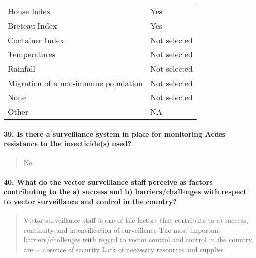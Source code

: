 \documentclass[
]{article}
\begin{document}
\begin{longtable}[]{@{}ll@{}}
\toprule
\endhead
House Index & Yes \\
Breteau Index & Yes \\
Container Index & Not selected \\
Temperatures & Not selected \\
Rainfall & Not selected \\
Migration of a non-immune population & Not selected \\
None & Not selected \\
Other & NA \\
\bottomrule
\end{longtable}

\hypertarget{is-there-a-surveillance-system-in-place-for-monitoring-aedes-resistance-to-the-insecticides-used}{%
\paragraph{39. Is there a surveillance system in place for monitoring
Aedes resistance to the insecticide(s)
used?}\label{is-there-a-surveillance-system-in-place-for-monitoring-aedes-resistance-to-the-insecticides-used}}

\begin{quote}
No
\end{quote}

\hypertarget{what-do-the-vector-surveillance-staff-perceive-as-factors-contributing-to-the-a-success-and-b-barrierschallenges-with-respect-to-vector-surveillance-and-control-in-the-country}{%
\paragraph{40. What do the vector surveillance staff perceive as factors
contributing to the a) success and b) barriers/challenges with respect
to vector surveillance and control in the
country?}\label{what-do-the-vector-surveillance-staff-perceive-as-factors-contributing-to-the-a-success-and-b-barrierschallenges-with-respect-to-vector-surveillance-and-control-in-the-country}}

\begin{quote}
Vector surveillance staff is one of the factors that contribute to a)
success, continuity and intensification of surveillance The most
important barriers/challenges with regard to vector control and control
in the country are: -- absence of security Lack of necessary resources
and supplies
\end{quote}
\end{document}
